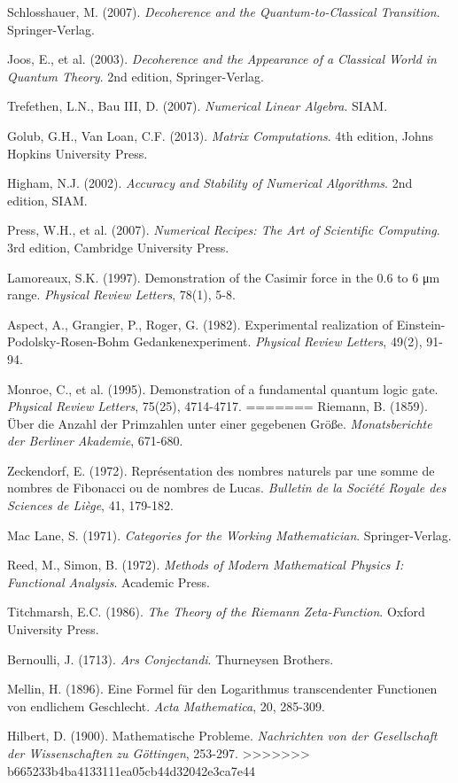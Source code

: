 \documentclass[12pt]{article}
\theoremstyle{plain}
\theoremstyle{definition}
\begin{document}
\begin{thebibliography}{99}
 Schlosshauer, M. (2007). \emph{Decoherence and the Quantum-to-Classical Transition}. Springer-Verlag.

 Joos, E., et al. (2003). \emph{Decoherence and the Appearance of a Classical World in Quantum Theory}. 2nd edition, Springer-Verlag.

 Trefethen, L.N., Bau III, D. (2007). \emph{Numerical Linear Algebra}. SIAM.

 Golub, G.H., Van Loan, C.F. (2013). \emph{Matrix Computations}. 4th edition, Johns Hopkins University Press.

 Higham, N.J. (2002). \emph{Accuracy and Stability of Numerical Algorithms}. 2nd edition, SIAM.

 Press, W.H., et al. (2007). \emph{Numerical Recipes: The Art of Scientific Computing}. 3rd edition, Cambridge University Press.

 Lamoreaux, S.K. (1997). Demonstration of the Casimir force in the 0.6 to 6 μm range. \emph{Physical Review Letters}, 78(1), 5-8.

 Aspect, A., Grangier, P., Roger, G. (1982). Experimental realization of Einstein-Podolsky-Rosen-Bohm Gedankenexperiment. \emph{Physical Review Letters}, 49(2), 91-94.

 Monroe, C., et al. (1995). Demonstration of a fundamental quantum logic gate. \emph{Physical Review Letters}, 75(25), 4714-4717.
=======
 Riemann, B. (1859). Über die Anzahl der Primzahlen unter einer gegebenen Größe. \emph{Monatsberichte der Berliner Akademie}, 671-680.

 Zeckendorf, E. (1972). Représentation des nombres naturels par une somme de nombres de Fibonacci ou de nombres de Lucas. \emph{Bulletin de la Société Royale des Sciences de Liège}, 41, 179-182.

 Mac Lane, S. (1971). \emph{Categories for the Working Mathematician}. Springer-Verlag.

 Reed, M., Simon, B. (1972). \emph{Methods of Modern Mathematical Physics I: Functional Analysis}. Academic Press.

 Titchmarsh, E.C. (1986). \emph{The Theory of the Riemann Zeta-Function}. Oxford University Press.

 Bernoulli, J. (1713). \emph{Ars Conjectandi}. Thurneysen Brothers.

 Mellin, H. (1896). Eine Formel für den Logarithmus transcendenter Functionen von endlichem Geschlecht. \emph{Acta Mathematica}, 20, 285-309.

 Hilbert, D. (1900). Mathematische Probleme. \emph{Nachrichten von der Gesellschaft der Wissenschaften zu Göttingen}, 253-297.
>>>>>>> b665233b4ba4133111ea05cb44d32042e3ca7e44

\end{thebibliography}
\end{document}
